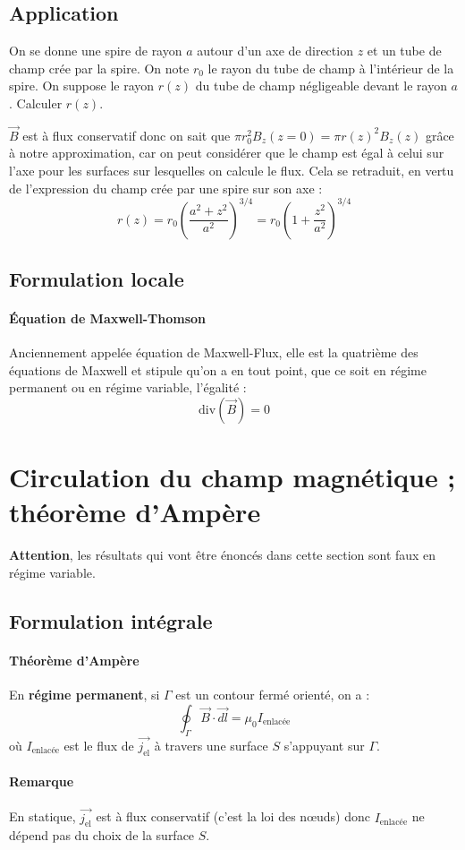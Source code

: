 \documentclass[french]{book}
\theoremstyle{plain}
\theoremstyle{definition}
\theoremstyle{remark}
\renewcommand{\div}{\text{div}}
\begin{document}
\subsection{Application}
On se donne une spire de rayon $a$ autour d'un axe de direction $z$ et un tube de champ crée par la spire. On note $r_0$ le rayon du tube de champ à l'intérieur de la spire. On suppose le rayon $r(z)$ du tube de champ négligeable devant le rayon $a$. Calculer $r(z)$. \\ \par 
$\overrightarrow{B}$ est à flux conservatif donc on sait que $\pi r_0^2B_z(z=0)=\pi r(z)^2B_z(z)$ grâce à notre approximation, car on peut considérer que le champ est égal à celui sur l'axe pour les surfaces sur lesquelles on calcule le flux. Cela se retraduit, en vertu de l'expression du champ crée par une spire sur son axe : $$r(z)=r_0\left(\frac{a^2+z^2}{a^2}\right)^{3/4}=r_0\left(1+\frac{z^2}{a^2}\right)^{3/4}$$
\subsection{Formulation locale}
\paragraph{Équation de Maxwell-Thomson} Anciennement appelée équation de Maxwell-Flux, elle est la quatrième des équations de Maxwell et stipule qu'on a en tout point, que ce soit en régime permanent ou en régime variable, l'égalité : $$\div(\overrightarrow{B})=0$$
\section{Circulation du champ magnétique ; théorème d'Ampère}
\textbf{Attention}, les résultats qui vont être énoncés dans cette section sont faux en régime variable.
\subsection{Formulation intégrale}
\paragraph{Théorème d'Ampère} En \textbf{régime permanent}, si $\Gamma$ est un contour fermé orienté, on a : $$\oint_\Gamma\overrightarrow{B}\cdot\overrightarrow{dl}=\mu_0I_\text{enlacée}$$ où $I_\text{enlacée}$ est le flux de $\overrightarrow{j_\text{el}}$ à travers une surface $S$ s'appuyant sur $\Gamma$.
\paragraph{Remarque} En statique, $\overrightarrow{j_\text{el}}$ est à flux conservatif (c'est la loi des nœuds) donc $I_\text{enlacée}$ ne dépend pas du choix de la surface $S$.
\end{document}

